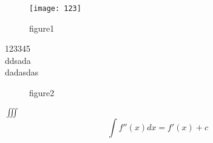 \documentclass[12pt,oneside,a4paper]{ctexart}
\begin{document}
\begin{figure}[htbp]
	\centering
		\texttt{[image: 123]}	
	\caption{figure1}
\end{figure}

123345\\ddsada\\
dadasdas\\

\begin{figure}[htbp]
	\centering
	\subfloat[12321]{\texttt{[image: 123]}}	
	\subfloat[32123]{\texttt{[image: 123]}}	
	\caption{figure2}
\end{figure}

$ \iiint $
\begin{equation}
	\int f''(x) dx = f'(x) + c
\end{equation}
\end{document}
